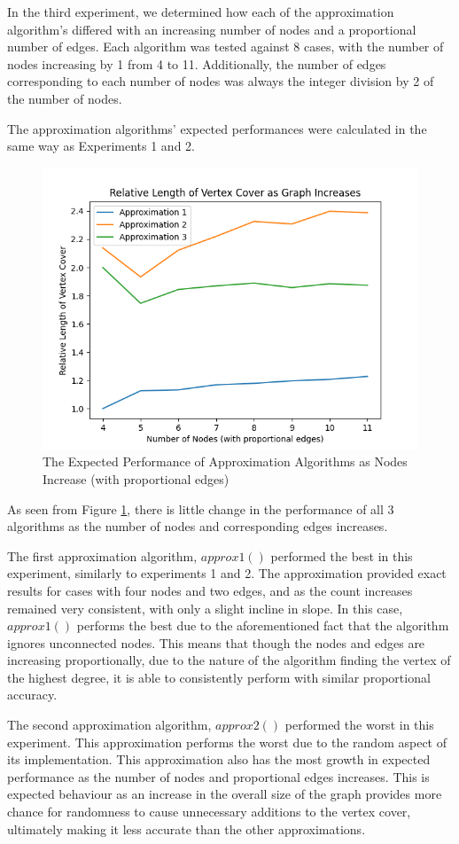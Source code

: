 \documentclass[titlepage]{article}
\begin{document}
In the third experiment, we determined how each of the approximation algorithm's differed with an increasing number of nodes and a proportional number of edges. Each algorithm was tested against 8 cases, with the number of nodes increasing by 1 from 4 to 11. Additionally, the number of edges corresponding to each number of nodes was always the integer division by 2 of the number of nodes.

The approximation algorithms' expected performances were calculated in the same way as Experiments 1 and 2.

\begin{figure}[H]
    \centering
    \includegraphics[width=0.8\linewidth]{experiment_3_3.png}
    \caption{The Expected Performance of Approximation Algorithms as Nodes Increase (with proportional edges)}
    \label{fig:experiment_3_3}
\end{figure}

As seen from Figure \ref{fig:experiment_3_3}, there is little change in the performance of all 3 algorithms as the number of nodes and corresponding edges increases.

The first approximation algorithm, $approx1()$ performed the best in this experiment, similarly to experiments 1 and 2. The approximation provided exact results for cases with four nodes and two edges, and as the count increases remained very consistent, with only a slight incline in slope. In this case, $approx1()$ performs the best due to the aforementioned fact that the algorithm ignores unconnected nodes. This means that though the nodes and edges are increasing proportionally, due to the nature of the algorithm finding the vertex of the highest degree, it is able to consistently perform with similar proportional accuracy.

The second approximation algorithm, $approx2()$ performed the worst in this experiment. This approximation performs the worst due to the random aspect of its implementation. This approximation also has the most growth in expected performance as the number of nodes and proportional edges increases. This is expected behaviour as an increase in the overall size of the graph provides more chance for randomness to cause unnecessary additions to the vertex cover, ultimately making it less accurate than the other approximations.
\end{document}
